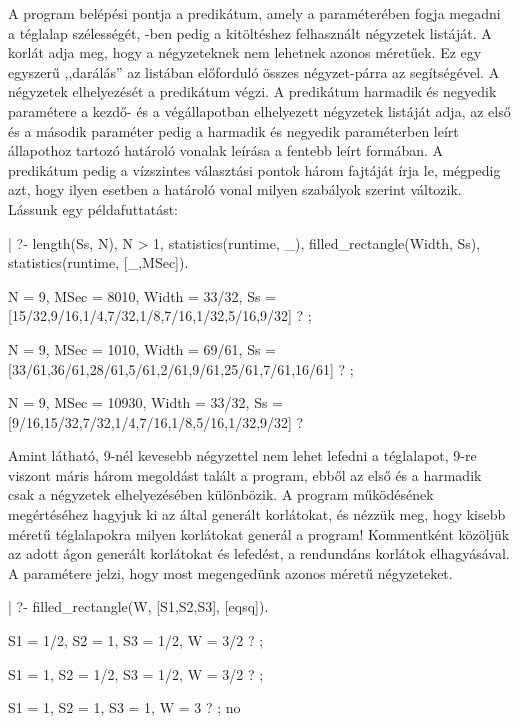A program belépési pontja a  predikátum, amely
a  paraméterében fogja megadni a téglalap szélességét, -ben
pedig a kitöltéshez felhasznált négyzetek listáját. A 
korlát adja meg, hogy a négyzeteknek nem lehetnek azonos méretűek. Ez egy
egyszerű ,,darálás'' az  listában előforduló összes négyzet-párra
az  segítségével. A négyzetek elhelyezését a 
predikátum végzi. A predikátum harmadik és negyedik paramétere a kezdő-
és a végállapotban elhelyezett négyzetek listáját adja, az első és a második
paraméter pedig a harmadik és negyedik paraméterben leírt állapothoz tartozó
határoló vonalak leírása a fentebb leírt formában. A 
predikátum pedig a vízszintes választási pontok három fajtáját írja le,
mégpedig azt, hogy ilyen esetben a határoló vonal milyen szabályok szerint
változik.
\br
Lássunk egy példafuttatást:
\begin{prologcode}
| ?-    length(Ss, N), N > 1, statistics(runtime, _),
        filled_rectangle(Width, Ss), 
        statistics(runtime, [_,MSec]).

N = 9, MSec = 8010, Width = 33/32,
Ss = [15/32,9/16,1/4,7/32,1/8,7/16,1/32,5/16,9/32] ? ;

N = 9, MSec = 1010, Width = 69/61,
Ss = [33/61,36/61,28/61,5/61,2/61,9/61,25/61,7/61,16/61] ? ;

N = 9, MSec = 10930, Width = 33/32,
Ss = [9/16,15/32,7/32,1/4,7/16,1/8,5/16,1/32,9/32] ? 
\end{prologcode}
Amint látható, 9-nél kevesebb négyzettel nem lehet lefedni a téglalapot,
9-re viszont máris három megoldást talált a program, ebből az első és
a harmadik csak a négyzetek elhelyezésében különbözik.
\br
A program működésének megértéséhez hagyjuk ki az  által
generált korlátokat, és nézzük meg, hogy kisebb méretű téglalapokra milyen
korlátokat generál a program! Kommentként közöljük az adott ágon generált
korlátokat és lefedést, a rendundáns korlátok elhagyásával. A
 \cd{[eqsq]} paramétere jelzi, hogy most megengedünk
azonos méretű négyzeteket.
\begin{prologcode}
| ?- filled_rectangle(W, [S1,S2,S3], [eqsq]).

S1 = 1/2, S2 = 1, S3 = 1/2, W = 3/2 ? ;    %

S1 = 1, S2 = 1/2, S3 = 1/2, W = 3/2 ? ;    %

S1 = 1, S2 = 1, S3 = 1, W = 3 ? ; no

\end{prologcode}

